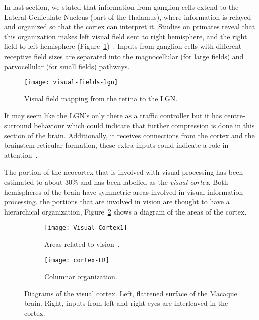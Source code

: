 In last section, we stated that information from ganglion cells extend to the Lateral Geniculate Nucleus (part of the thalamus), where information is relayed and organized so that the cortex can interpret it. Studies on primates reveal that this organization makes left visual field sent to right hemisphere, and the right field to left hemisphere (Figure~\ref{fig:vision:optic-chiasm})~\cite{thompson2000brain}. Inputs from ganglion cells with different receptive field sizes are separated into the magnocellular (for large fields) and parvocellular (for small fields) pathways.

\begin{figure}[h]
  \begin{center}
    \texttt{[image: visual-fields-lgn]}
    \caption{Visual field mapping from the retina to the LGN.}
    \label{fig:vision:optic-chiasm}
  \end{center}
\end{figure}

It may seem like the LGN's only there as a traffic controller but it has centre-surround behaviour which could indicate that further compression is done in this section of the brain. Additionally, it receives connections from the cortex and the brainstem reticular formation, these extra inputs could indicate a role in attention~\cite{eye-brain-vision-hubel1995}.

The portion of the neocortex that is involved with visual processing has been estimated to about 30\% and has been labelled as the \emph{visual cortex}. Both hemispheres of the brain have symmetric areas involved in visual information processing. the portions that are involved in vision are thought to have a hierarchical organization, Figure~\ref{fig:vision:visual-cortex} shows a diagram of the areas of the cortex.

\begin{figure}[h]
  \begin{center}
    \begin{subfigure}[b]{0.65\textwidth}
      \texttt{[image: Visual-Cortex1]}
      \caption{Areas related to vision~\cite{webvision-images}.}
      \label{fig:vision:visual-cortex}
    \end{subfigure}
    \begin{subfigure}[b]{0.34\textwidth}
      \texttt{[image: cortex-LR]}
      \caption{Columnar organization.}
      \label{fig:vision:visual-cortex-LR}
    \end{subfigure}
    \caption{Diagrams of the visual cortex. Left, flattened surface of the Macaque brain. Right, inputs from left and right eyes are interleaved in the cortex. }
  \end{center}
\end{figure}

